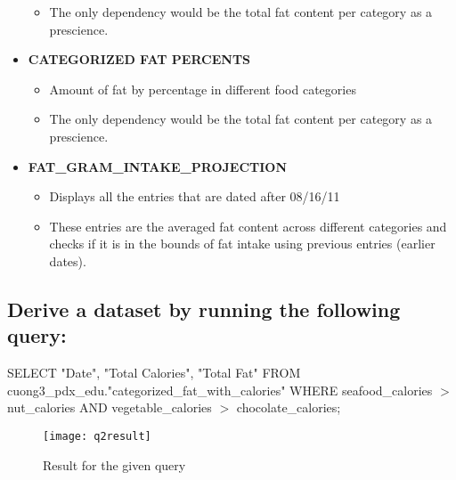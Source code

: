 \documentclass[a4paper]{article}
\begin{document}
\begin{itemize}
\begin{itemize}
    \item The only dependency would be the total fat content per category as a prescience. 
	\end{itemize}
\item \textbf{CATEGORIZED FAT PERCENTS}
	\begin{itemize}
	\item Amount of fat by percentage in different food categories
    \item The only dependency would be the total fat content per category as a prescience.
	\end{itemize}
\item \textbf{FAT\_GRAM\_INTAKE\_PROJECTION}
	\begin{itemize}
	\item Displays all the entries that are dated after 08/16/11 
    \item These entries are the averaged fat content across different categories and checks if it is in the bounds of fat intake using previous entries (earlier dates). 
	\end{itemize}
    
\end{itemize}

\subsection{Derive a dataset by running the following query:}
SELECT "Date", "Total Calories", "Total Fat" FROM cuong3\_pdx\_edu."categorized\_fat\_with\_calories" WHERE seafood\_calories $>$ nut\_calories AND vegetable\_calories $>$ chocolate\_calories;
\begin{figure}
\texttt{[image: q2result]}
\caption{Result for the given query}
\end{figure}
\end{document}
